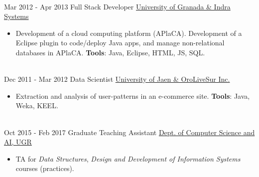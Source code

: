 \documentclass[letterpaper]{twentysecondcv} %
\begin{document}
\begin{twenty}
\\
	  \twentyitem
    	{Mar 2012 -}
		{Apr 2013}
        {Full Stack Developer}
        {\href{https://www.indracompany.com/en/}{University of Granada \& Indra Systems}}
        {}
        {\begin{itemize}
        	\item Development of a cloud computing platform (APlaCA). Development of a Eclipse plugin to code/deploy Java apps, and manage non-relational databases in APlaCA. \textbf{Tools}: Java, Eclipse, HTML, JS, SQL.
        \end{itemize}}
        \\
        \twentyitem
    	{Dec 2011 -}
		{Mar 2012}
        {Data Scientist}
        {\href{http://en.orolivesur.com/}{University of Jaen \& OroLiveSur Inc.}}
        {}
        {\begin{itemize}
        	\item Extraction and analysis of user-patterns in an e-commerce site. \textbf{Tools}: Java, Weka, KEEL.
        \end{itemize}}
        \\
    \twentyitem
   		{Oct 2015 -}
		{Feb 2017}
        {Graduate Teaching Assistant}
        {\href{http://decsai.ugr.es/index.php}{Dept. of Computer Science and AI, UGR}}
        {}
        {
        {\begin{itemize}
        \item TA for \textit{Data Structures}, \textit{Design and Development of Information Systems} courses (practices).
    \end{itemize}}
        }
\end{twenty}
\end{document}
